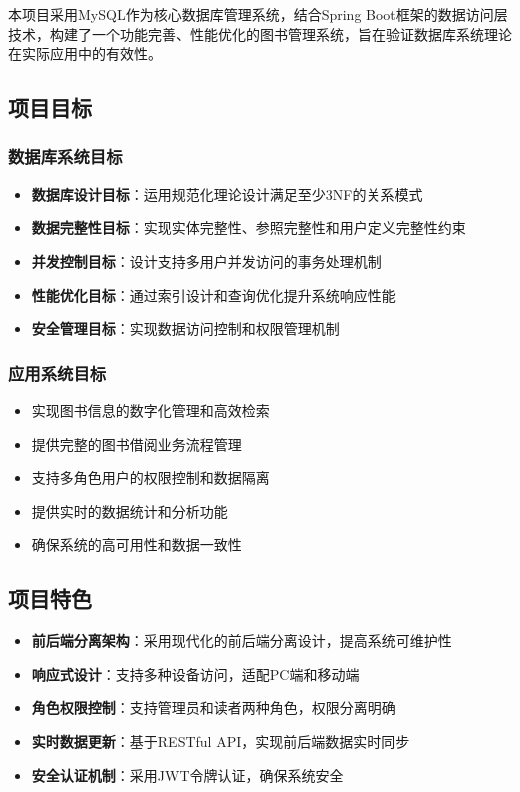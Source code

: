 \documentclass[12pt,a4paper]{article}
\begin{document}
本项目采用MySQL作为核心数据库管理系统，结合Spring Boot框架的数据访问层技术，构建了一个功能完善、性能优化的图书管理系统，旨在验证数据库系统理论在实际应用中的有效性。

\subsection{项目目标}

\subsubsection{数据库系统目标}
\begin{itemize}
    \item \textbf{数据库设计目标}：运用规范化理论设计满足至少3NF的关系模式
    \item \textbf{数据完整性目标}：实现实体完整性、参照完整性和用户定义完整性约束
    \item \textbf{并发控制目标}：设计支持多用户并发访问的事务处理机制
    \item \textbf{性能优化目标}：通过索引设计和查询优化提升系统响应性能
    \item \textbf{安全管理目标}：实现数据访问控制和权限管理机制
\end{itemize}

\subsubsection{应用系统目标}
\begin{itemize}
    \item 实现图书信息的数字化管理和高效检索
    \item 提供完整的图书借阅业务流程管理
    \item 支持多角色用户的权限控制和数据隔离
    \item 提供实时的数据统计和分析功能
    \item 确保系统的高可用性和数据一致性
\end{itemize}

\subsection{项目特色}
\begin{itemize}
    \item \textbf{前后端分离架构}：采用现代化的前后端分离设计，提高系统可维护性
    \item \textbf{响应式设计}：支持多种设备访问，适配PC端和移动端
    \item \textbf{角色权限控制}：支持管理员和读者两种角色，权限分离明确
    \item \textbf{实时数据更新}：基于RESTful API，实现前后端数据实时同步
    \item \textbf{安全认证机制}：采用JWT令牌认证，确保系统安全
\end{itemize}
\end{document}
